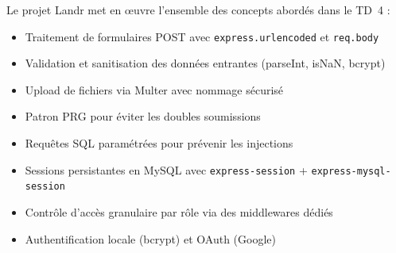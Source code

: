 \documentclass[12pt,a4paper]{article}
\begin{document}
Le projet Landr met en \oe{}uvre l'ensemble des concepts abordés dans le TD~4 :
\begin{itemize}[noitemsep]
  \item Traitement de formulaires POST avec \texttt{express.urlencoded} et \texttt{req.body}
  \item Validation et sanitisation des données entrantes (parseInt, isNaN, bcrypt)
  \item Upload de fichiers via Multer avec nommage sécurisé
  \item Patron PRG pour éviter les doubles soumissions
  \item Requêtes SQL paramétrées pour prévenir les injections
  \item Sessions persistantes en MySQL avec \texttt{express-session} + \texttt{express-mysql-session}
  \item Contrôle d'accès granulaire par rôle via des middlewares dédiés
  \item Authentification locale (bcrypt) et OAuth (Google)
\end{itemize}
\end{document}
